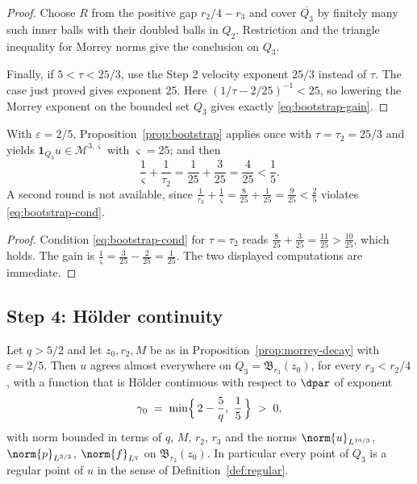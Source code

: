\documentclass[11pt,reqno]{amsart}
\begin{document}
\begin{proof}
Choose $R$ from the positive gap $r_2/4-r_3$ and cover
$\overline{Q_3}$ by finitely many such inner balls with their doubled
balls in $Q_2$. Restriction and the triangle inequality for Morrey norms
give the conclusion on $Q_3$.

Finally, if $5<\tau<25/3$, use the Step 2 velocity exponent $25/3$
instead of $\tau$. The case just proved gives exponent $25$.
Here $(1/\tau-2/25)^{-1}<25$, so lowering the Morrey exponent on
the bounded set $Q_3$ gives exactly \eqref{eq:bootstrap-gain}.
\end{proof}

\begin{corollary}\label{cor:one-round}
With $\varepsilon=2/5$, Proposition~\ref{prop:bootstrap} applies once with
$\tau=\tau_{2}=25/3$ and yields $\mathbf{1}_{Q_{3}}u\in\mathcal{M}^{3,\varsigma}$
with $\varsigma=25$; and then
\begin{equation}\label{eq:one-round}
  \frac1\varsigma+\frac1{\tau_{2}}=\frac1{25}+\frac3{25}=\frac4{25}<\frac15 .
\end{equation}
A second round is not available, since
$\tfrac1{\tau_{3}}+\tfrac1\varsigma=\tfrac8{25}+\tfrac1{25}=\tfrac9{25}<\tfrac25$
violates \eqref{eq:bootstrap-cond}.
\end{corollary}

\begin{proof}
Condition \eqref{eq:bootstrap-cond} for $\tau=\tau_{2}$ reads
$\tfrac8{25}+\tfrac3{25}=\tfrac{11}{25}>\tfrac{10}{25}$, which holds. The gain
is $\tfrac1\varsigma=\tfrac3{25}-\tfrac2{25}=\tfrac1{25}$. The two displayed
computations are immediate.
\end{proof}

\subsection{Step 4: H\"older continuity}\label{ss:step4}

\begin{theorem}[Endgame]\label{thm:endgame}
Let $q>5/2$ and let $z_{0},r_{2},M$ be as in
Proposition~\ref{prop:morrey-decay} with $\varepsilon=2/5$. Then $u$ agrees
almost everywhere on $Q_{3}=\mathfrak{B}_{r_{3}}(z_{0})$, for every
$r_{3}<r_{2}/4$, with a function that is H\"older continuous with respect to
$\dpar$ of exponent
\begin{equation}\label{eq:gamma-value}
  \gamma_{0}\;=\;\min\Bigl\{\,2-\frac5q,\ \frac15\,\Bigr\}\;>\;0,
\end{equation}
with norm bounded in terms of $q$, $M$, $r_{2}$, $r_{3}$ and the norms
$\norm{u}_{L^{10/3}}$, $\norm{p}_{L^{3/2}}$, $\norm{f}_{L^{q}}$ on
$\mathfrak{B}_{r_{2}}(z_{0})$. In particular every point of $Q_{3}$ is a regular
point of $u$ in the sense of Definition~\ref{def:regular}.
\end{theorem}
\end{document}
